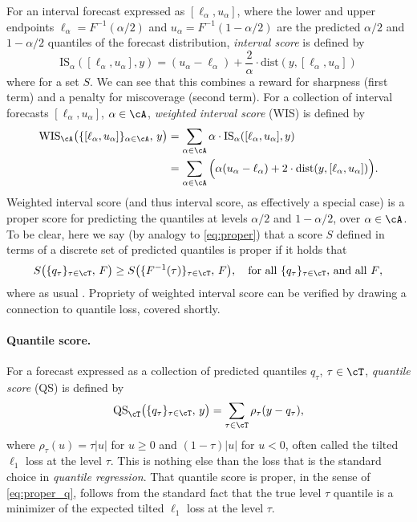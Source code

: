 \documentclass{article}
\begin{document}
For an interval forecast expressed as $[\ell_\alpha, u_\alpha]$, where the lower
and upper endpoints $\ell_\alpha = F^{-1}(\alpha/2)$ and $u_\alpha =
F^{-1}(1-\alpha/2)$ are the predicted $\alpha/2$ and $1-\alpha/2$ quantiles of
the forecast distribution, \emph{interval score} is defined by 
\[
\mathrm{IS}_\alpha( [\ell_\alpha, u_\alpha], y) = 
(u_\alpha - \ell_\alpha) + \frac{2}{\alpha} \cdot
\mathrm{dist}(y, [\ell_\alpha, u_\alpha])
\]
where  for a set $S$. We can
see that this combines a reward for sharpness (first term) and a penalty for 
miscoverage (second term). For a collection of interval forecasts
$[\ell_\alpha, u_\alpha]$, $\alpha \in \cA$, \emph{weighted interval score}
(WIS) is defined by
\begin{align}
\nonumber
\mathrm{WIS}_\cA \big( \{[\ell_\alpha, u_\alpha]\}_{\alpha \in \cA}, \, y \big)  
&= \sum_{\alpha \in \cA} \alpha \cdot \mathrm{IS}_\alpha( [\ell_\alpha,
  u_\alpha], y) \\
\label{eq:wis}
&=\sum_{\alpha \in \cA} \Big(\alpha (u_\alpha - \ell_\alpha) + 2 \cdot
  \mathrm{dist}(y, [\ell_\alpha, u_\alpha]) \Big).
\end{align}
Weighted interval score (and thus interval score, as effectively a special case)
is a proper score for predicting the quantiles at levels $\alpha/2$ and
$1-\alpha/2$, over $\alpha \in \cA$. To be clear, here we say (by analogy to 
\eqref{eq:proper}) that a score $S$ defined in terms of a discrete set of
predicted quantiles  is proper if it holds
that    
\begin{equation}
\label{eq:proper_q}
S \big( \{q_\tau\}_{\tau \in \cT}, \, F \big) \geq S \big(
\{F^{-1}(\tau)\}_{\tau \in \cT}, \, F \big), \quad \text{for all
$\{q_\tau\}_{\tau \in \cT}$, and all $F$},    
\end{equation}
where as usual . Propriety of weighted interval score  
can be verified by drawing a connection to quantile loss, covered shortly.  

\paragraph{Quantile score.}

For a forecast expressed as a collection of predicted quantiles $q_\tau$, $\tau
\in \cT$, \emph{quantile score} (QS) is defined by 
\begin{equation}
\label{eq:qs}
\mathrm{QS}_\cT \big( \{q_\tau\}_{\tau \in \cT}, \, y \big) = 
\sum_{\tau \in \cT} \rho_\tau(y - q_\tau),
\end{equation}
where $\rho_\tau(u) = \tau |u|$ for $u \geq 0$ and $(1-\tau) |u|$ for $u < 0$,
often called the tilted $\ell_1$ loss at the level $\tau$. This is nothing else
than the loss that is the standard choice in \emph{quantile regression}. That
quantile score is proper, in the sense of \eqref{eq:proper_q}, follows from the
standard fact that the true level $\tau$ quantile is a minimizer of the expected
tilted $\ell_1$ loss at the level $\tau$.
\end{document}
